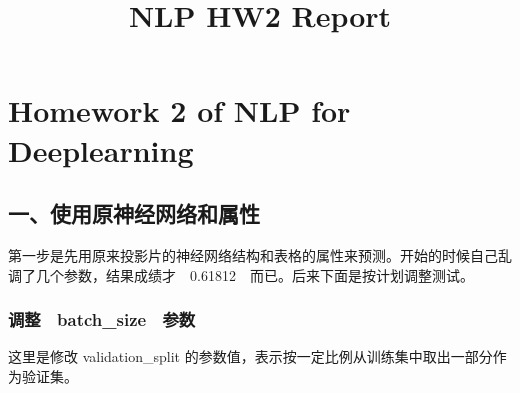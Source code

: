 \documentclass[11pt]{article}
\title{NLP HW2 Report}
\begin{document}
    
    
    \maketitle
    
    

    
    \section{Homework 2 of NLP for
Deeplearning}\label{homework-2-of-nlp-for-deeplearning}

    \subsection{一、使用原神经网络和属性}\label{ux4e00ux4f7fux7528ux539fux795eux7ecfux7f51ux7edcux548cux5c5eux6027}

    第一步是先用原来投影片的神经网络结构和表格的属性来预测。开始的时候自己乱调了几个参数，结果成绩才　0.61812　而已。后来下面是按计划调整测试。

\subsubsection{调整　batch\_size　参数}\label{ux8c03ux6574batchux5fsizeux53c2ux6570}

这里是修改 validation\_split
的参数值，表示按一定比例从训练集中取出一部分作为验证集。
\end{document}
